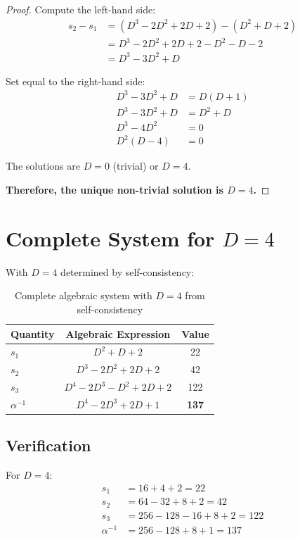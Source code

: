 \documentclass[12pt,a4paper]{article}
\begin{document}
\begin{proof}
Compute the left-hand side:
\begin{align*}
s_2 - s_1 &= (D^3 - 2D^2 + 2D + 2) - (D^2 + D + 2) \\
&= D^3 - 2D^2 + 2D + 2 - D^2 - D - 2 \\
&= D^3 - 3D^2 + D
\end{align*}

Set equal to the right-hand side:
\begin{align*}
D^3 - 3D^2 + D &= D(D+1) \\
D^3 - 3D^2 + D &= D^2 + D \\
D^3 - 4D^2 &= 0 \\
D^2(D - 4) &= 0
\end{align*}

The solutions are $D = 0$ (trivial) or $D = 4$.

\textbf{Therefore, the unique non-trivial solution is $D = 4$.}
\end{proof}

\section{Complete System for $D = 4$}

With $D = 4$ determined by self-consistency:

\begin{table}[h]
\centering
\begin{tabular}{lcc}
\toprule
\textbf{Quantity} & \textbf{Algebraic Expression} & \textbf{Value} \\
\midrule
$s_1$ & $D^2 + D + 2$ & 22 \\
$s_2$ & $D^3 - 2D^2 + 2D + 2$ & 42 \\
$s_3$ & $D^4 - 2D^3 - D^2 + 2D + 2$ & 122 \\
$\alpha^{-1}$ & $D^4 - 2D^3 + 2D + 1$ & \textbf{137} \\
\bottomrule
\end{tabular}
\caption{Complete algebraic system with $D = 4$ from self-consistency}
\end{table}

\subsection{Verification}

For $D = 4$:
\begin{align*}
s_1 &= 16 + 4 + 2 = 22 \\
s_2 &= 64 - 32 + 8 + 2 = 42 \\
s_3 &= 256 - 128 - 16 + 8 + 2 = 122 \\
\alpha^{-1} &= 256 - 128 + 8 + 1 = 137
\end{align*}
\end{document}
